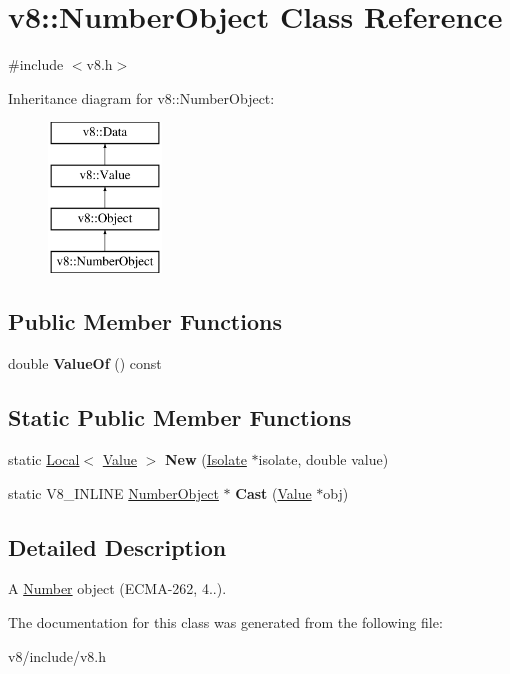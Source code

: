 \hypertarget{classv8_1_1NumberObject}{}\section{v8\+:\+:Number\+Object Class Reference}
\label{classv8_1_1NumberObject}


{\ttfamily \#include $<$v8.\+h$>$}

Inheritance diagram for v8\+:\+:Number\+Object\+:\begin{figure}[H]
\begin{center}
\leavevmode
\includegraphics[height=4.000000cm]{classv8_1_1NumberObject}
\end{center}
\end{figure}
\subsection*{Public Member Functions}
\begin{DoxyCompactItemize}
\item 
\mbox{\label{classv8_1_1NumberObject_abe15c092159cea5dc15908cce77b8a40}} 
double {\bfseries Value\+Of} () const
\end{DoxyCompactItemize}
\subsection*{Static Public Member Functions}
\begin{DoxyCompactItemize}
\item 
\mbox{\label{classv8_1_1NumberObject_ad6e3d9fe36d6389fe90f2645cab8a2d7}} 
static \mbox{\hyperlink{classv8_1_1Local}{Local}}$<$ \mbox{\hyperlink{classv8_1_1Value}{Value}} $>$ {\bfseries New} (\mbox{\hyperlink{classv8_1_1Isolate}{Isolate}} $\ast$isolate, double value)
\item 
\mbox{\label{classv8_1_1NumberObject_a77500b6fed40f36fed616e865fd1ed07}} 
static V8\+\_\+\+I\+N\+L\+I\+NE \mbox{\hyperlink{classv8_1_1NumberObject}{Number\+Object}} $\ast$ {\bfseries Cast} (\mbox{\hyperlink{classv8_1_1Value}{Value}} $\ast$obj)
\end{DoxyCompactItemize}


\subsection{Detailed Description}
A \mbox{\hyperlink{classv8_1_1Number}{Number}} object (E\+C\+M\+A-\/262, 4..). 

The documentation for this class was generated from the following file\+:\begin{DoxyCompactItemize}
\item 
v8/include/v8.\+h\end{DoxyCompactItemize}
